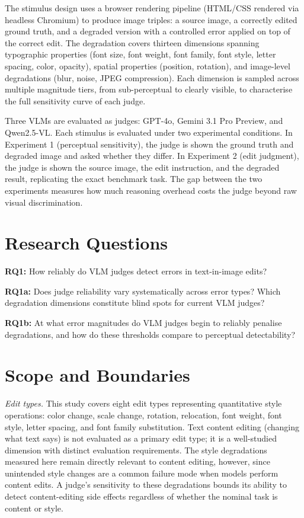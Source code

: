 The stimulus design uses a browser rendering pipeline (HTML/CSS rendered via headless Chromium) to produce image triples: a source image, a correctly edited ground truth, and a degraded version with a controlled error applied on top of the correct edit. The degradation covers thirteen dimensions spanning typographic properties (font size, font weight, font family, font style, letter spacing, color, opacity), spatial properties (position, rotation), and image-level degradations (blur, noise, JPEG compression). Each dimension is sampled across multiple magnitude tiers, from sub-perceptual to clearly visible, to characterise the full sensitivity curve of each judge.

Three VLMs are evaluated as judges: GPT-4o, Gemini 3.1 Pro Preview, and Qwen2.5-VL. Each stimulus is evaluated under two experimental conditions. In Experiment 1 (perceptual sensitivity), the judge is shown the ground truth and degraded image and asked whether they differ. In Experiment 2 (edit judgment), the judge is shown the source image, the edit instruction, and the degraded result, replicating the exact benchmark task. The gap between the two experiments measures how much reasoning overhead costs the judge beyond raw visual discrimination.

\section{Research Questions}

\label{Research Questions}

\noindent \textbf{RQ1:} How reliably do VLM judges detect errors in text-in-image edits?

\noindent \textbf{RQ1a:} Does judge reliability vary systematically across error types? Which degradation dimensions constitute blind spots for current VLM judges?

\noindent \textbf{RQ1b:} At what error magnitudes do VLM judges begin to reliably penalise degradations, and how do these thresholds compare to perceptual detectability?

\section{Scope and Boundaries}

\label{Scope and Boundaries}

\textit{Edit types.} This study covers eight edit types representing quantitative style operations: color change, scale change, rotation, relocation, font weight, font style, letter spacing, and font family substitution. Text content editing (changing what text says) is not evaluated as a primary edit type; it is a well-studied dimension with distinct evaluation requirements. The style degradations measured here remain directly relevant to content editing, however, since unintended style changes are a common failure mode when models perform content edits. A judge's sensitivity to these degradations bounds its ability to detect content-editing side effects regardless of whether the nominal task is content or style.

